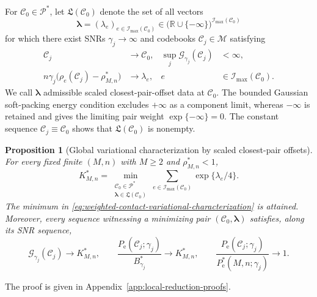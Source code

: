 \documentclass[12pt,draftclsnofoot,onecolumn]{IEEEtran}
\newcommand{\R}{\mathbb{R}}
\newcommand{\cC}{\mathcal{C}}
\newcommand{\cG}{\mathcal{G}}
\newcommand{\cI}{\mathcal{I}}
\newcommand{\cM}{\mathcal{M}}
\newcommand{\cP}{\mathcal{P}}
\newcommand{\Pe}{P_{\mathrm e}}
\newtheorem{proposition}{Proposition}
\theoremstyle{definition}
\begin{document}
For \(\cC_0\in\cP^{\ast}\), let
\(\mathfrak L(\cC_0)\) denote the set of all vectors
\begin{equation*}
  \bm\lambda
  =(\lambda_e)_{e\in\cI_{\max}(\cC_0)}
  \in
  \bigl(\R\cup\{-\infty\}\bigr)^{\cI_{\max}(\cC_0)}
\end{equation*}
for which there exist SNRs \(\gamma_j\to\infty\) and codebooks
\(\cC_j\in\cM\) satisfying
\begin{equation}
\begin{aligned}
  \cC_j&\longrightarrow\cC_0,
  &\sup_j\cG_{\gamma_j}(\cC_j)&<\infty,\\
  n\gamma_j\bigl(\rho_e(\cC_j)-\rho^{\ast}_{M,n}\bigr)
  &\longrightarrow\lambda_e,
  &e&\in\cI_{\max}(\cC_0).
\end{aligned}
\label{eq:admissible-contact-limit-set}
\end{equation}
We call \(\bm\lambda\) admissible scaled closest-pair-offset data at
\(\cC_0\).  The bounded Gaussian soft-packing energy condition excludes \(+\infty\) as a
component limit, whereas \(-\infty\) is retained and gives the limiting
pair weight \(\exp\{-\infty\}=0\).  The constant sequence
\(\cC_j\equiv\cC_0\) shows that \(\mathfrak L(\cC_0)\) is nonempty.

\begin{proposition}[Global variational characterization by scaled closest-pair offsets]
\label{prop:weighted-contact-variational-characterization}
For every fixed finite \((M,n)\) with \(M\ge2\) and
\(\rho^{\ast}_{M,n}<1\),
\begin{equation}
  K^{\ast}_{M,n}
  =
  \min_{\substack{
    \cC_0\in\cP^{\ast}\\
    \bm\lambda\in\mathfrak L(\cC_0)}}
  \sum_{e\in\cI_{\max}(\cC_0)}
  \exp\{\lambda_e/4\}.
  \label{eq:weighted-contact-variational-characterization}
\end{equation}
The minimum in \eqref{eq:weighted-contact-variational-characterization}
is attained.  Moreover, every
sequence witnessing a minimizing pair \((\cC_0,\bm\lambda)\) satisfies,
along its SNR sequence,
\begin{equation*}
  \cG_{\gamma_j}(\cC_j)\longrightarrow K^{\ast}_{M,n},
  \qquad
  \frac{\Pe(\cC_j;\gamma_j)}{B_{\gamma_j}^{\ast}}
  \longrightarrow K^{\ast}_{M,n},
  \qquad
  \frac{\Pe(\cC_j;\gamma_j)}
  {\Pe^{\ast}(M,n;\gamma_j)}\longrightarrow1.
\end{equation*}
\end{proposition}

\begin{IEEEproof}
The proof is given in
Appendix~\ref{app:local-reduction-proofs}.
\end{IEEEproof}
\end{document}
